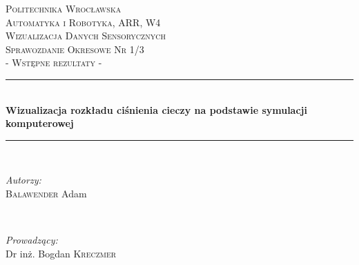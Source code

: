 \begin{titlepage}

\newcommand{\HRule}{\rule{\linewidth}{0.5mm}} %

\center %
 

\textsc{\LARGE Politechnika Wrocławska\\} 
\vspace{0.5cm}
\textsc{\large Automatyka i Robotyka, ARR, W4}\\[1.5cm] %
\textsc{\Large Wizualizacja Danych Sensorycznych}\\[0.5cm] %
\textsc{\large Sprawozdanie Okresowe Nr 1/3 \\ - Wstępne rezultaty -}\\[0.5cm] %


\HRule \\[0.4cm]
{ \huge \bfseries Wizualizacja rozkładu ciśnienia cieczy na podstawie symulacji komputerowej}\\[0.4cm] %
\HRule \\[1.5cm]
 

\begin{minipage}{0.4\textwidth}
\begin{flushleft} \large
\emph{Autorzy:}\\
\textsc{Balawender} Adam %
\end{flushleft}
\end{minipage}
~
\begin{minipage}{0.4\textwidth}
\begin{flushright} \large
\emph{Prowadzący:} \\
Dr inż. Bogdan \textsc{Kreczmer} %
\end{flushright}
\end{minipage}\\[0.1cm]


\end{titlepage}
